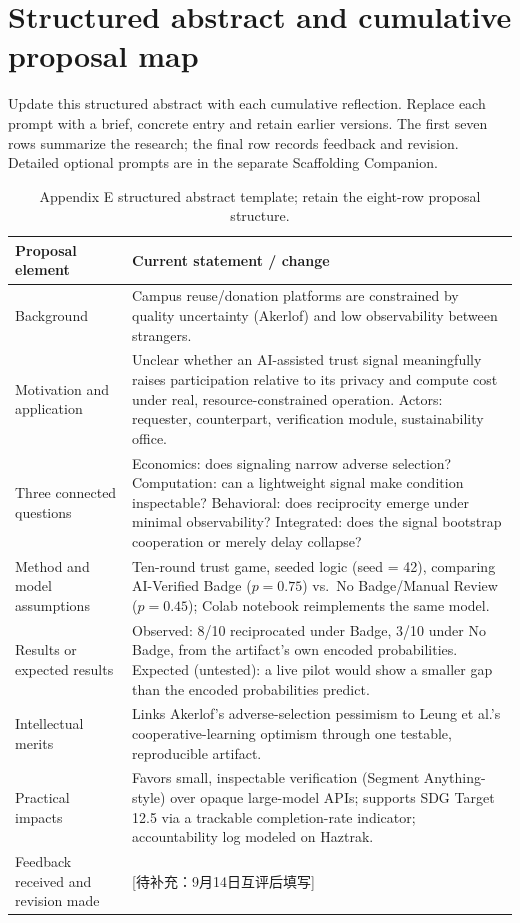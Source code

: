 \section{Structured abstract and cumulative proposal map}\label{app:abstract}
Update this structured abstract with each cumulative reflection. Replace each prompt with a brief, concrete entry and retain earlier versions. The first seven rows summarize the research; the final row records feedback and revision. Detailed optional prompts are in the separate Scaffolding Companion.
\par\medskip
\begin{table}[H]
\caption{Appendix E structured abstract template; retain the eight-row proposal structure.}
\label{tab:abstract-map}
\renewcommand{\arraystretch}{1.18}
\begin{tabularx}{\textwidth}{@{}p{}Y@{}}
\toprule
\textbf{Proposal element} & \textbf{Current statement / change} \\
\midrule
Background & Campus reuse/donation platforms are constrained by quality uncertainty (Akerlof) and low observability between strangers. \\
Motivation and application & Unclear whether an AI-assisted trust signal meaningfully raises participation relative to its privacy and compute cost under real, resource-constrained operation. Actors: requester, counterpart, verification module, sustainability office. \\
Three connected questions & Economics: does signaling narrow adverse selection? Computation: can a lightweight signal make condition inspectable? Behavioral: does reciprocity emerge under minimal observability? Integrated: does the signal bootstrap cooperation or merely delay collapse? \\
Method and model assumptions & Ten-round trust game, seeded logic (seed = 42), comparing AI-Verified Badge ($p=0.75$) vs.\ No Badge/Manual Review ($p=0.45$); Colab notebook reimplements the same model. \\
Results or expected results & Observed: 8/10 reciprocated under Badge, 3/10 under No Badge, from the artifact's own encoded probabilities. Expected (untested): a live pilot would show a smaller gap than the encoded probabilities predict. \\
Intellectual merits & Links Akerlof's adverse-selection pessimism to Leung et al.'s cooperative-learning optimism through one testable, reproducible artifact. \\
Practical impacts & Favors small, inspectable verification (Segment Anything-style) over opaque large-model APIs; supports SDG Target 12.5 via a trackable completion-rate indicator; accountability log modeled on Haztrak. \\
Feedback received and revision made & [待补充：9月14日互评后填写] \\
\bottomrule
\end{tabularx}
\end{table}
